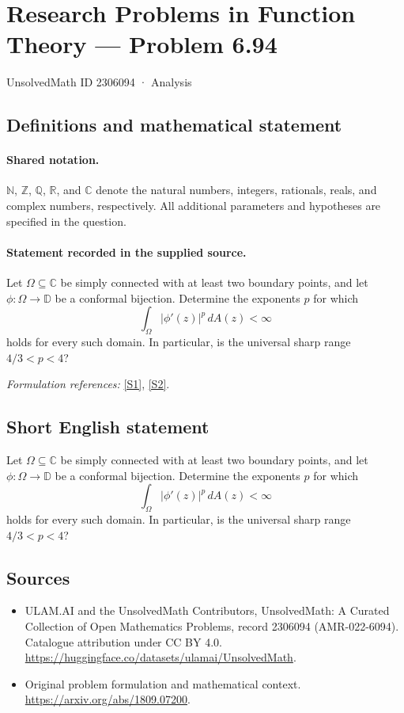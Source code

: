 \documentclass[11pt]{article}
\newcommand{\sref}[2]{\hyperlink{source:#1:#2}{[S#2]}}
\begin{document}
\setcounter{section}{2306093}
\section{Research Problems in Function Theory — Problem 6.94}\label{2306094}
{\small UnsolvedMath ID 2306094 · Analysis}
\subsection{Definitions and mathematical statement}

\paragraph{Shared notation.}$\mathbb N$, $\mathbb Z$, $\mathbb Q$, $\mathbb R$, and $\mathbb C$ denote the natural numbers, integers, rationals, reals, and complex numbers, respectively. All additional parameters and hypotheses are specified in the question.


\paragraph{Statement recorded in the supplied source.}
Let $\Omega\subseteq\mathbb C$ be simply connected with at least two boundary points, and let $\phi:\Omega\to\mathbb D$ be a conformal bijection. Determine the exponents $p$ for which
\[\int_\Omega|\phi'(z)|^p\,dA(z)<\infty\]
holds for every such domain. In particular, is the universal sharp range $4/3<p<4$?
\par\smallskip\textit{Formulation references:} \sref{2306094}{1}, \sref{2306094}{2}.
\subsection{Short English statement}
Let $\Omega\subseteq\mathbb C$ be simply connected with at least two boundary points, and let $\phi:\Omega\to\mathbb D$ be a conformal bijection. Determine the exponents $p$ for which
\[\int_\Omega|\phi'(z)|^p\,dA(z)<\infty\]
holds for every such domain. In particular, is the universal sharp range $4/3<p<4$?
\subsection{Sources}
\begin{itemize}
\item[\hypertarget{source:2306094:1}{S1}] ULAM.AI and the UnsolvedMath Contributors, UnsolvedMath: A Curated Collection of Open Mathematics Problems, record 2306094 (AMR-022-6094). Catalogue attribution under CC BY 4.0.
\url{https://huggingface.co/datasets/ulamai/UnsolvedMath}.
\item[\hypertarget{source:2306094:2}{S2}] Original problem formulation and mathematical context.
\url{https://arxiv.org/abs/1809.07200}.
\end{itemize}
\label{end:2306094}
\end{document}
